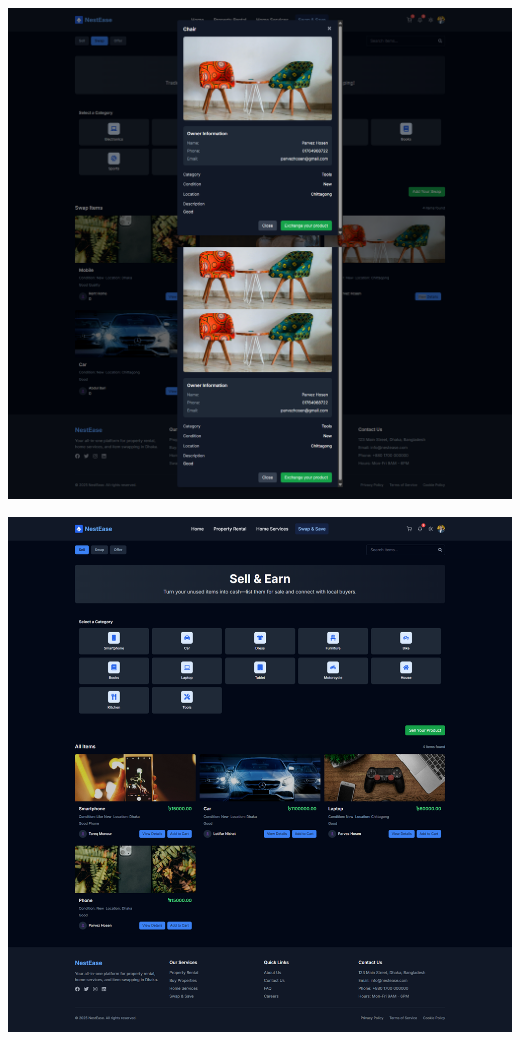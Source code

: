 \documentclass[conference]{IEEEtran}
\begin{document}
\begin{center}
\noindent
\begin{minipage}[t]{0.45\textwidth}
\includegraphics[width=\linewidth]{Project Screenshot/Swap & Save SWAP.png}
\end{minipage} \hfill
\begin{minipage}[t]{0.45\textwidth}
\includegraphics[width=\linewidth]{Project Screenshot/Swap & Save Sell.png}
\end{minipage}


\end{center}
\end{document}
